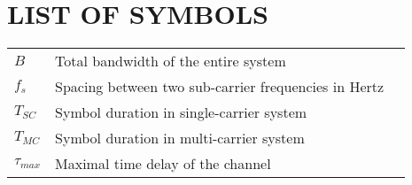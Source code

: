 \section*{LIST OF SYMBOLS}
 {}

\begin{tabularx}{0.9\textwidth}{ L{0.4} L{1.3} L{1.3} }
    $B$ & Total bandwidth of the entire system \\ %
    $f_s$ & Spacing between two sub-carrier frequencies in Hertz \\
    $T_{SC}$ & Symbol duration in single-carrier system \\ 
    $T_{MC}$ & Symbol duration in multi-carrier system \\
    $\tau_{max}$ & Maximal time delay of the channel \\
\end{tabularx}

\newpage